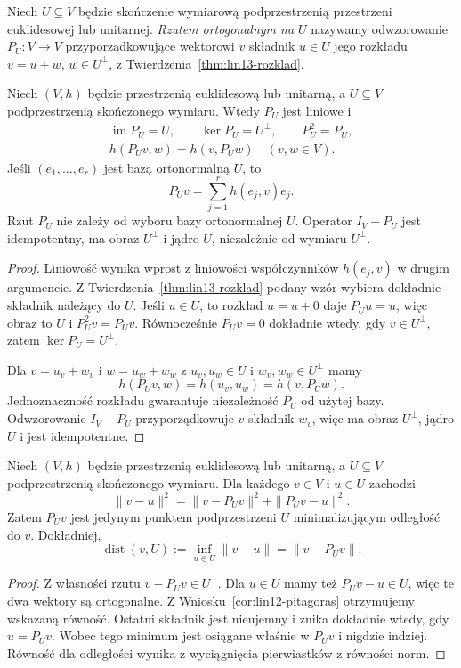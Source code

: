 \begin{definicja}
\label{def:lin13-rzut}
Niech \(U\subseteq V\) będzie
skończenie wymiarową podprzestrzenią
przestrzeni euklidesowej lub unitarnej.
\emph{Rzutem ortogonalnym na \(U\)}
nazywamy odwzorowanie
\(P_U\colon V\to V\) przyporządkowujące
wektorowi \(v\) składnik \(u\in U\)
jego rozkładu \(v=u+w\),
\(w\in U^\perp\), z
Twierdzenia~\ref{thm:lin13-rozklad}.
\end{definicja}

\begin{twierdzenie}
\label{thm:lin13-rzut-wlasnosci}
Niech \((V,h)\) będzie przestrzenią
euklidesową lub unitarną, a
\(U\subseteq V\) podprzestrzenią
skończonego wymiaru.
Wtedy \(P_U\) jest liniowe i
\[
 \begin{gathered}
 \operatorname{im}P_U=U,\qquad
 \ker P_U=U^\perp,\qquad
 P_U^2=P_U,\\
 h(P_Uv,w)=h(v,P_Uw)
 \quad(v,w\in V).
 \end{gathered}
\]
Jeśli \((e_1,\ldots,e_r)\)
jest bazą ortonormalną \(U\), to
\[
 P_Uv=\sum_{j=1}^r h(e_j,v)e_j.
\]
Rzut \(P_U\) nie zależy od
wyboru bazy ortonormalnej \(U\).
Operator \(I_V-P_U\) jest idempotentny,
ma obraz \(U^\perp\) i jądro \(U\),
niezależnie od wymiaru \(U^\perp\).
\end{twierdzenie}
\begin{proof}
Liniowość wynika wprost
z liniowości współczynników
\(h(e_j,v)\) w drugim argumencie.
Z
Twierdzenia~\ref{thm:lin13-rozklad}
podany wzór wybiera dokładnie
składnik należący do \(U\).
Jeśli \(u\in U\), to rozkład
\(u=u+0\) daje \(P_Uu=u\),
więc obraz to \(U\) i
\(P_U^2v=P_Uv\).
Równocześnie \(P_Uv=0\)
dokładnie wtedy, gdy \(v\in U^\perp\),
zatem \(\ker P_U=U^\perp\).

Dla \(v=u_v+w_v\) i
\(w=u_w+w_w\) z \(u_v,u_w\in U\)
i \(w_v,w_w\in U^\perp\) mamy
\[
 h(P_Uv,w)=h(u_v,u_w)
          =h(v,P_Uw).
\]
Jednoznaczność rozkładu
gwarantuje niezależność \(P_U\)
od użytej bazy.
Odwzorowanie \(I_V-P_U\)
przyporządkowuje \(v\)
składnik \(w_v\), więc ma
obraz \(U^\perp\), jądro \(U\)
i jest idempotentne.
\end{proof}

\begin{twierdzenie}
\label{thm:lin13-najlepsze}
Niech \((V,h)\) będzie
przestrzenią euklidesową lub unitarną,
a \(U\subseteq V\) podprzestrzenią
skończonego wymiaru.
Dla każdego \(v\in V\)
i \(u\in U\) zachodzi
\[
 \|v-u\|^2
 =\|v-P_Uv\|^2+\|P_Uv-u\|^2.
\]
Zatem \(P_Uv\) jest jedynym
punktem podprzestrzeni \(U\)
minimalizującym odległość do \(v\).
Dokładniej,
\[
 \operatorname{dist}(v,U)
 :=\inf_{u\in U}\|v-u\|
 =\|v-P_Uv\|.
\]
\end{twierdzenie}
\begin{proof}
Z własności rzutu
\(v-P_Uv\in U^\perp\).
Dla \(u\in U\) mamy też
\(P_Uv-u\in U\), więc te
dwa wektory są ortogonalne.
Z
Wniosku~\ref{cor:lin12-pitagoras}
otrzymujemy wskazaną równość.
Ostatni składnik jest nieujemny
i znika dokładnie wtedy,
gdy \(u=P_Uv\).
Wobec tego minimum jest
osiągane właśnie w \(P_Uv\)
i nigdzie indziej.
Równość dla odległości
wynika z wyciągnięcia
pierwiastków z równości norm.
\end{proof}

